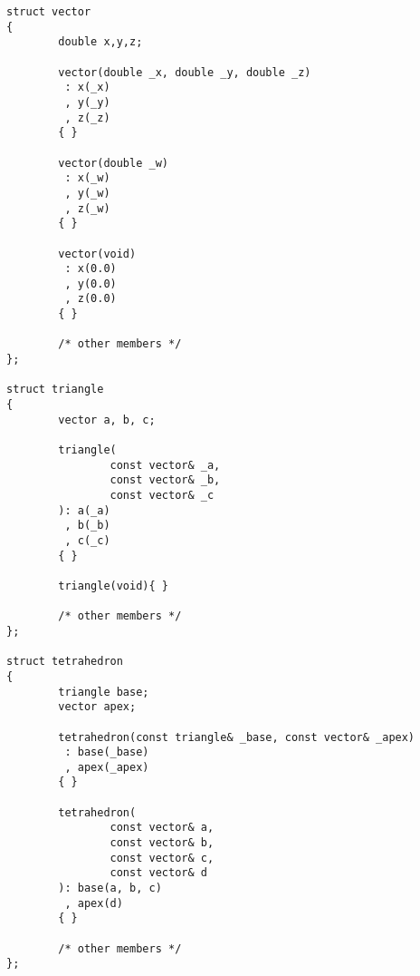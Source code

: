 \begin{lstlisting}
struct vector
{
        double x,y,z;

        vector(double _x, double _y, double _z)
         : x(_x)
         , y(_y)
         , z(_z)
        { }

        vector(double _w)
         : x(_w)
         , y(_w)
         , z(_w)
        { }

        vector(void)
         : x(0.0)
         , y(0.0)
         , z(0.0)
        { }

        /* other members */
};

struct triangle
{
        vector a, b, c;

        triangle(
                const vector& _a,
                const vector& _b,
                const vector& _c
        ): a(_a)
         , b(_b)
         , c(_c)
        { }

        triangle(void){ }

        /* other members */
};

struct tetrahedron
{
        triangle base;
        vector apex;

        tetrahedron(const triangle& _base, const vector& _apex)
         : base(_base)
         , apex(_apex)
        { }

        tetrahedron(
                const vector& a,
                const vector& b,
                const vector& c,
                const vector& d
        ): base(a, b, c)
         , apex(d)
        { }

        /* other members */
};

\end{lstlisting}


